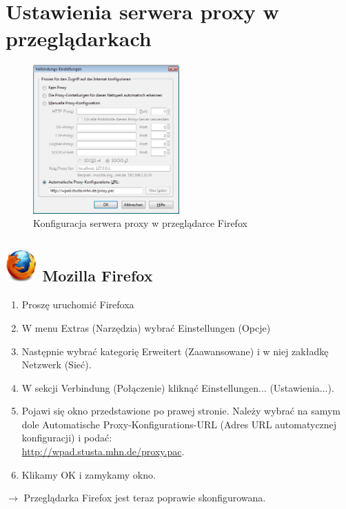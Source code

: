 \documentclass[a4paper,12pt]{scrartcl}
\begin{document}
\newpage

\section*{Ustawienia serwera proxy w przeglądarkach}

\begin{figure}
  \begin{center}
    \includegraphics[width=0.5\textwidth,keepaspectratio]{Bilder/Proxy_Firefox}
  \end{center}
  \caption{Konfiguracja serwera proxy w przeglądarce Firefox}
\end{figure}

\subsection*{\includegraphics[height=1.2cm,keepaspectratio]{Bilder/Firefox_35_logo} Mozilla Firefox}
\begin{enumerate}
    \item Proszę uruchomić Firefoxa
    \item W menu Extras (Narzędzia) wybrać Einstellungen (Opcje)
    \item Następnie wybrać kategorię Erweitert (Zaawansowane) i w niej zakładkę Netzwerk (Sieć).
    \item W sekcji Verbindung (Połączenie) kliknąć Einstellungen... (Ustawienia...).
    \item Pojawi się okno przedstawione po prawej stronie. Należy wybrać na samym dole Automatische Proxy-Konfigurations-URL (Adres URL automatycznej konfiguracji) i podać:\\ \url{http://wpad.stusta.mhn.de/proxy.pac}.
    \item Klikamy OK i zamykamy okno.
\end{enumerate}
$\rightarrow$ Przeglądarka Firefox jest teraz poprawie skonfigurowana.
\end{document}
